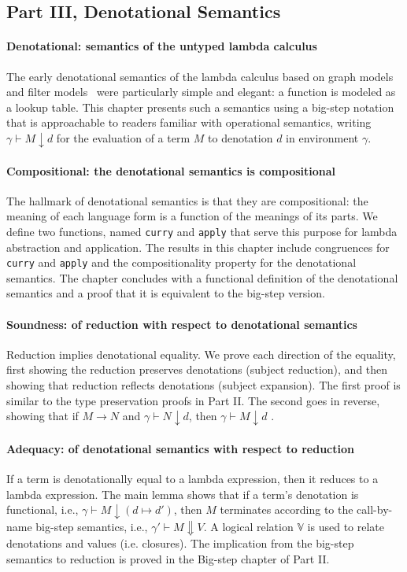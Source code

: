 \documentclass[preprint,authoryear]{elsarticle}
\begin{document}
\subsection*{Part III, Denotational Semantics}

\paragraph{Denotational: semantics of the untyped lambda calculus}
The early denotational semantics of the lambda calculus based on graph
models~\citep{Scott-1976,Engeler-1981,Plotkin-1993} and filter
models~\citep{Barendregt-1983} were particularly simple and elegant: a
function is modeled as a lookup table.  This chapter presents such a
semantics using a big-step notation that is approachable to readers
familiar with operational semantics, writing $\gamma \vdash M
\downarrow d$ for the evaluation of a term $M$ to denotation $d$ in
environment $\gamma$.

\paragraph{Compositional: the denotational semantics is compositional}
The hallmark of denotational semantics is that they are compositional:
the meaning of each language form is a function of the meanings of its
parts.
%
We define two functions, named \texttt{curry} and \texttt{apply} that
serve this purpose for lambda abstraction and application.
%
The results in this chapter include congruences for \texttt{curry} and
\texttt{apply} and the compositionality property for the denotational
semantics.
%
The chapter concludes with a functional definition of the denotational
semantics and a proof that it is equivalent to the big-step version.

\paragraph{Soundness: of reduction with respect to denotational semantics}
Reduction implies denotational equality. We prove each direction of
the equality, first showing the reduction preserves denotations
(subject reduction), and then showing that reduction reflects
denotations (subject expansion). The first proof is similar to the
type preservation proofs in Part II. The second goes in reverse,
showing that if $M \longrightarrow N$ and $\gamma \vdash N
\downarrow d$, then $\gamma \vdash M \downarrow d$ .

\paragraph{Adequacy: of denotational semantics with respect to reduction}
If a term is denotationally equal to a lambda expression, then it
reduces to a lambda expression. The main lemma shows that if a term's
denotation is functional, i.e., $\gamma \vdash M \downarrow (d \mapsto
d')$, then $M$ terminates according to the call-by-name big-step
semantics, i.e., $\gamma' \vdash M \Downarrow V$. A logical relation
$\mathbb{V}$ is used to relate denotations and values (i.e. closures).
The implication from the big-step semantics to reduction is proved in
the Big-step chapter of Part II.
\end{document}

